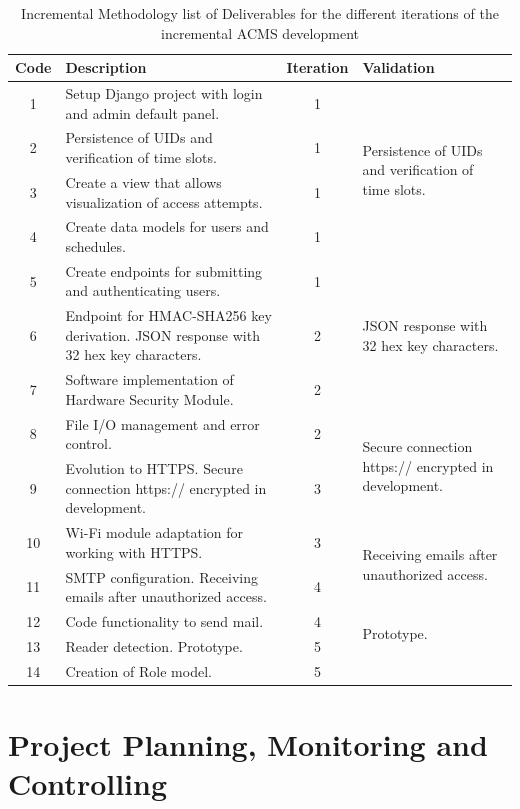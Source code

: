 \begin{table}[H]
	\small
	\begin{tabular}{|c|p{5cm}|c|p{3.5cm}|}
		\hline
		\textbf{Code} & \textbf{Description} & \textbf{Iteration} & \textbf{Validation} \\ \hline
		1  & Setup Django project with login and admin default panel. & 1 & \multirow{4}{*}{\parbox{3.5cm}{Persistence of UIDs and verification of time slots.}} \\ \cline{1-3}
		2  & Persistence of UIDs and verification of time slots. & 1 & \\ \cline{1-3}
		3  & Create a view that allows visualization of access attempts. & 1 & \\ \cline{1-3}
		4  & Create data models for users and schedules. & 1 & \\ \hline
		5  & Create endpoints for submitting and authenticating users. & 1 & \multirow{3}{*}{\parbox{3.5cm}{JSON response with 32 hex key characters.}} \\ \cline{1-3}
		6  & Endpoint for HMAC-SHA256 key derivation. JSON response with 32 hex key characters. & 2 & \\ \cline{1-3}
		7  & Software implementation of Hardware Security Module. & 2 & \\ \hline
		8  & File I/O management and error control. & 2 & \multirow{2}{*}{\parbox{3.5cm}{Secure connection https:// encrypted in development.}} \\ \cline{1-3}
		9  & Evolution to HTTPS. Secure connection https:// encrypted in development. & 3 & \\ \hline
		10 & Wi-Fi module adaptation for working with HTTPS. & 3 & \multirow{2}{*}{\parbox{3.5cm}{Receiving emails after unauthorized access.}} \\ \cline{1-3}
		11 & SMTP configuration. Receiving emails after unauthorized access. & 4 & \\ \hline
		12 & Code functionality to send mail. & 4 & \multirow{2}{*}{\parbox{3.5cm}{Prototype.}} \\ \cline{1-3}
		13 & Reader detection. Prototype. & 5 & \\ \hline
		14 & Creation of Role model. & 5 & \\ \hline
	\end{tabular}
	\caption{Incremental Methodology list of Deliverables for the different iterations of the incremental ACMS development}
	\label{tab:deliverables}
\end{table}


\section{Project Planning, Monitoring and Controlling}

